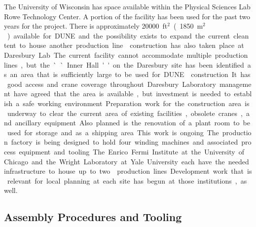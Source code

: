 The University of Wisconsin has space available within the Physical Sciences Lab Rowe Technology Center. A portion of the facility has been used for the past two years for the  project. There is approximately \SI{20000}{ft$^2$} (\SI{1850}{m$^2$}) available for DUNE and the possibility exists to expand the current clean tent to house another production line. 

 construction has also taken place at Daresbury Lab.  The current facility cannot accommodate multiple production lines, but the ``Inner Hall'' on the Daresbury site has been identified as an area that is sufficiently large to be used for DUNE  construction. It has good access and crane coverage throughout. Daresbury Laboratory management have agreed that the area is available, but investment is needed to establish a safe working environment. Preparation work for the construction area is underway to clear the current area of existing facilities, obsolete cranes, and ancillary equipment. Also planned is the renovation of a plant room to be used for storage and as a shipping area. This work is ongoing. The production factory is being designed to hold four winding machines and associated process equipment and tooling. 

The Enrico Fermi Institute at the University of Chicago and the Wright Laboratory at Yale University each have the needed infrastructure to house up to two  production lines. Development work that is relevant for local planning at each site has begun at those institutions, as well.


\subsection{Assembly Procedures and Tooling}
\label{sec:fdsp-apa-assy}

